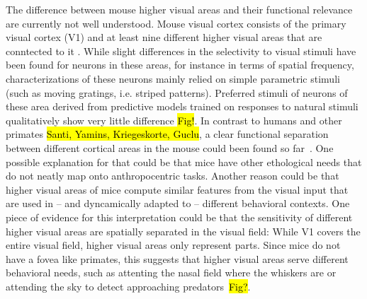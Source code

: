 The difference between mouse higher visual areas and their functional relevance are currently not well understood. Mouse visual cortex consists of the primary visual cortex (V1) and at least nine different higher visual areas that are conntected to it \parencite[AL, LM, LI, PM, RL, P, AM, POR, A, see ][]{Garrett2014-zm,Froudarakis2019-yt}. 
While slight differences in the selectivity to visual stimuli have been found for neurons in these areas, for instance in terms of spatial frequency, characterizations of these neurons mainly relied on simple parametric stimuli (such as moving gratings, i.e. striped patterns). Preferred stimuli of neurons of these area derived from predictive models trained on responses to natural stimuli qualitatively show very little difference \hl{Fig!}. 
In contrast to  humans and other primates \hl{Santi, Yamins, Kriegeskorte, Guclu}, a clear functional separation between different cortical areas in the mouse could been found so far~\parencite{Conwell2021-pw}.
One possible explanation for that could be that mice have other ethological needs that do not neatly map onto anthropocentric tasks. 
Another reason could be that higher visual areas of mice compute similar features from the visual input that are used in -- and dyncamically adapted to -- different behavioral contexts. 
One piece of evidence for this interpretation could be that the sensitivity of different higher visual areas are spatially separated in the visual field: 
While V1 covers the entire visual field, higher visual areas only represent parts. 
Since mice do not have a fovea like primates, this suggests that higher visual areas serve different behavioral needs, such as attenting the nasal field where the whiskers are or attending the sky to detect approaching predators~\parencite{Garrett2014-zm, Froudarakis2019-yt, Franke2022-do}\hl{Fig?}. 

